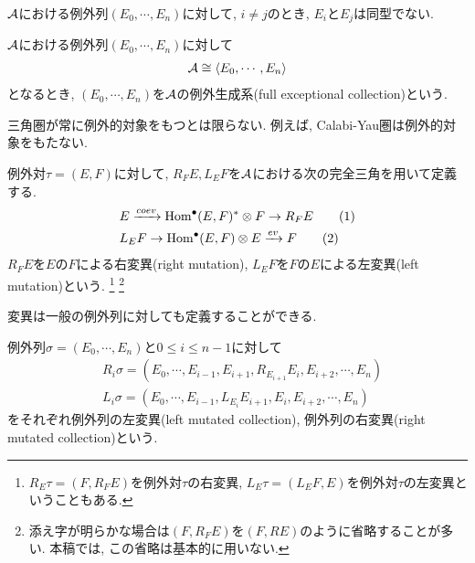 \documentclass[uplatex, a4paper, 14Q, dvipdfmx]{jsarticle}
\begin{document}
\begin{lemma}
  $\mathcal{A}$における例外列$(E_0,\cdots,E_n)$に対して, $i \neq j$のとき, $E_i$と$E_j$は同型でない. 
\end{lemma}

\begin{definition}[例外生成系]
  $\mathcal{A}$における例外列$(E_0,\cdots,E_n)$に対して
  \begin{align*}
    \mathcal{A} \cong \langle E_0,\cdots,E_n \rangle
  \end{align*}
  となるとき, $(E_0,\cdots,E_n)$を$\mathcal{A}$の例外生成系(full exceptional collection)という.  
\end{definition}

\begin{remark}
  三角圏が常に例外的対象をもつとは限らない. 
  例えば, Calabi-Yau圏は例外的対象をもたない. 
\end{remark}

\begin{definition}[例外対の変異]
  例外対$\tau = (E,F)$に対して, $R_FE, L_EF$を$\mathcal{A}$における次の完全三角を用いて定義する.
  \begin{align}
    & E \xrightarrow{coev} \mathrm{Hom}^\bullet(E,F)^\ast \otimes F \to R_FE \tag{1} \label{dist:R_FE} \\
    & L_EF \to \mathrm{Hom}^\bullet(E,F) \otimes E \xrightarrow{ev} F \tag{2} \label{dist:L_EF}
  \end{align}
  $R_FE$を$E$の$F$による右変異(right mutation), $L_EF$を$F$の$E$による左変異(left mutation)という. 
  \footnote{
    $R_E\tau = (F,R_FE)$を例外対$\tau$の右変異, $L_E\tau = (L_EF,E)$を例外対$\tau$の左変異ということもある. 
  }
  \footnote{
    添え字が明らかな場合は$(F,R_FE)$を$(F,RE)$のように省略することが多い. 
    本稿では, この省略は基本的に用いない. 
  }
\end{definition}

変異は一般の例外列に対しても定義することができる. 

\begin{definition}[例外列の変異]
  例外列$\sigma = (E_0,\cdots,E_n)$と$0 \leq i \leq n-1$に対して
  \begin{align*}
    & R_i\sigma = (E_0,\cdots,E_{i-1}, E_{i+1}, R_{E_{i+1}}E_i, E_{i+2},\cdots,E_n) \\
    & L_i\sigma = (E_0,\cdots,E_{i-1}, L_{E_i}E_{i+1}, E_i, E_{i+2},\cdots,E_n ) 
  \end{align*}
  をそれぞれ例外列の左変異(left mutated collection), 例外列の右変異(right mutated collection)という. 
\end{definition}
\end{document}
